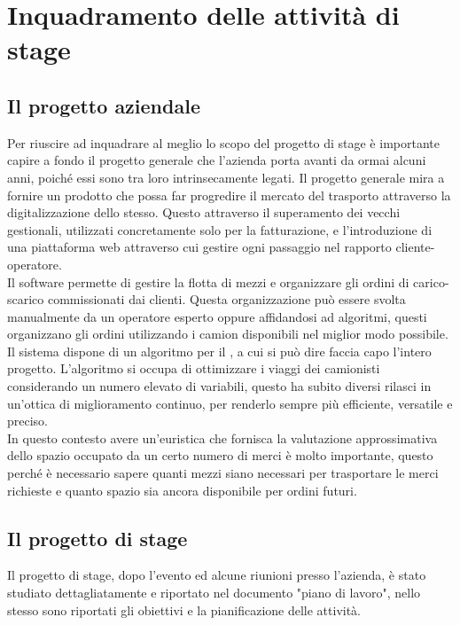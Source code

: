 
\hypertarget{(chap:capitolo3)}{}
\chapter{Inquadramento delle attività di stage}
\section{Il progetto aziendale}
Per riuscire ad inquadrare al meglio lo scopo del progetto di stage è importante capire a fondo il progetto generale che l'azienda porta avanti da ormai alcuni anni, poiché essi sono tra loro intrinsecamente legati. Il progetto generale mira a fornire un prodotto che possa far progredire il mercato del trasporto attraverso la digitalizzazione dello stesso. Questo attraverso il superamento dei vecchi gestionali, utilizzati concretamente solo per la fatturazione, e l'introduzione di una piattaforma web attraverso cui gestire ogni passaggio nel rapporto cliente-operatore.\\
Il software permette di gestire la flotta di mezzi e organizzare gli ordini di carico-scarico commissionati dai clienti. Questa organizzazione può essere svolta manualmente da un operatore esperto oppure affidandosi ad algoritmi, questi organizzano gli ordini utilizzando i camion disponibili nel miglior modo possibile.\\
Il sistema dispone di un algoritmo per il , a cui si può dire faccia capo l'intero progetto. L'algoritmo si occupa di ottimizzare i viaggi dei camionisti considerando un numero elevato di variabili, questo ha subito diversi rilasci in un'ottica di miglioramento continuo, per renderlo sempre più efficiente, versatile e preciso.\\
In questo contesto avere un'euristica che fornisca la valutazione approssimativa dello spazio occupato da un certo numero di merci è molto importante, questo perché è necessario sapere quanti mezzi siano necessari per trasportare le merci richieste e quanto spazio sia ancora disponibile per ordini futuri.

\section{Il progetto di stage}
Il progetto di stage, dopo l'evento  ed alcune riunioni presso l'azienda, è stato studiato dettagliatamente e riportato nel documento "piano di lavoro", nello stesso sono riportati gli obiettivi e la pianificazione delle attività.


